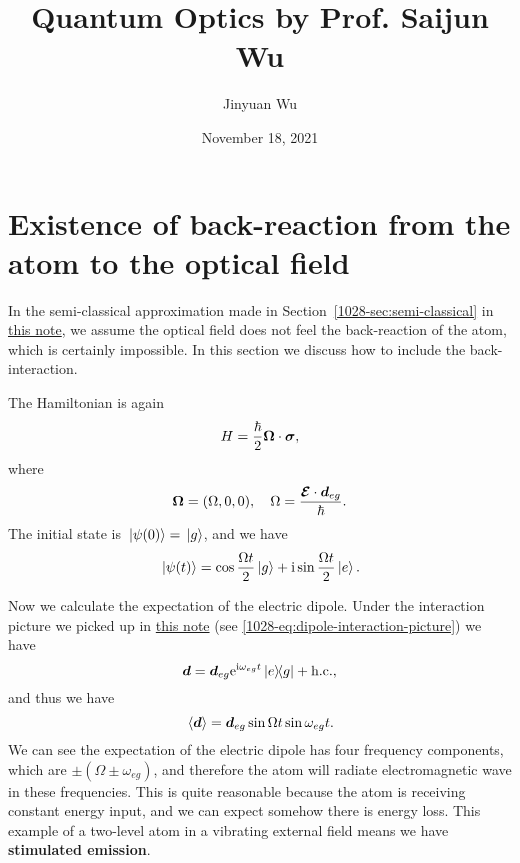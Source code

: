 \documentclass[hyperref, a4paper]{article}
\title{Quantum Optics by Prof. Saijun Wu}
\author{Jinyuan Wu}
\date{November 18, 2021}
\newcommand*{\ii}{\mathrm{i}}
\newcommand*{\ee}{\mathrm{e}}
\newcommand*{\concept}[1]{{\textbf{#1}}}
\newcommand{\atomicintrodoc}{\href{./10-28}{this note}}
\begin{document}
\maketitle

\section{Existence of back-reaction from the atom to the optical field}

In the semi-classical approximation made in Section~\ref{1028-sec:semi-classical} in \atomicintrodoc,
we assume the optical field does not feel the back-reaction of the atom, which is certainly impossible.
In this section we discuss how to include the back-interaction.

The Hamiltonian is again 
\begin{equation}
    H = \frac{\hbar}{2} \vb*{\Omega} \cdot \vb*{\sigma},
\end{equation}
where 
\begin{equation}
    \vb*{\Omega} = (\Omega, 0, 0), \quad \Omega = \frac{\vb*{\mathcal{E}} \cdot \vb*{d}_{eg}}{\hbar}.
\end{equation}
The initial state is $\ket*{\psi(0)} = \ket*{g}$, and we have 
\begin{equation}
    \ket*{\psi(t)} = \cos \frac{\Omega t}{2} \ket*{g} + \ii \sin \frac{\Omega t}{2} \ket*{e}.
\end{equation}

Now we calculate the expectation of the electric dipole.
Under the interaction picture we picked up in \atomicintrodoc{} (see \eqref{1028-eq:dipole-interaction-picture})
we have 
\begin{equation}
    \vb*{d} = \vb*{d}_{eg} \ee^{\ii \omega_{eg} t } \dyad*{e}{g} + \text{h.c.},
\end{equation}
and thus we have 
\begin{equation}
    \expval*{\vb*{d}} = \vb*{d}_{eg} \sin \Omega t \sin \omega_{eg} t .
\end{equation}
We can see the expectation of the electric dipole has four frequency components, which are $\pm (\Omega \pm \omega_{eg})$,
and therefore the atom will radiate electromagnetic wave in these frequencies.
This is quite reasonable because the atom is receiving constant energy input, and we can expect somehow there is energy loss.
This example of a two-level atom in a vibrating external field means we have \concept{stimulated emission}.
\end{document}
